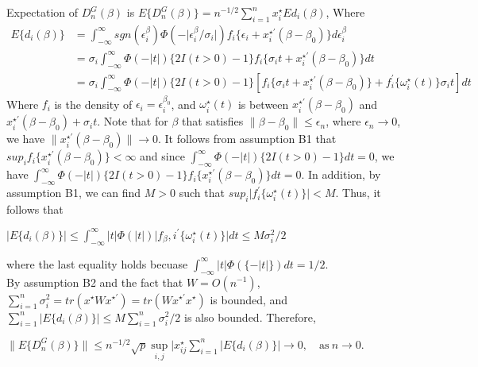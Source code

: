 \documentclass[12pt]{article}
\begin{document}
	\noindent Expectation of $D_n^G(\beta)$ is
	$E\{D_n^G(\beta)\}=n^{-1/2}\sum_{i=1}^{n}x_i^\star E{d_i(\beta)}$,
	Where 
	\begin{align*}
		E\{d_i(\beta)\} & = \int_{-\infty}^{\infty}sgn(\epsilon_i^\beta)\Phi(-\lvert\epsilon_i^\beta/\sigma_i\rvert)f_i\{\epsilon_i+x_i^{\star \prime}(\beta-\beta_0)\}d\epsilon_i^\beta\\
		& = \sigma_i \int_{-\infty}^{\infty}\Phi(-\lvert t \rvert)\{2I(t>0)-1\}f_i\{\sigma_i t + x_i^{\star \prime}(\beta-\beta_0)\}dt\\
		& = \sigma_i \int_{-\infty}^{\infty}\Phi(-\lvert t \rvert)\{2I(t>0)-1\}[f_i\{\sigma_i t + x_i^{\star \prime}(\beta-\beta_0)\}+f_i^\prime\{\omega_i^\star(t)\}\sigma_i t]dt
	\end{align*}
	\noindent Where $f_i$ is the density of $\epsilon_i=\epsilon_i^{\beta_0}$, and $\omega_i^\star(t)$ is between $x_i^{\star \prime} (\beta-\beta_0)$ and $x_i^{\star \prime} (\beta-\beta_0)+\sigma_i t$. Note that for $\beta$ that satisfies $\lVert \beta-\beta_0 \rVert \leq \epsilon_n$, where $\epsilon_n \to 0$, we have $\lVert x_i^{\star \prime} (\beta-\beta_0) \rVert \to 0$. It follows from assumption B1 that $sup_i f_i \{x_i^{\star \prime} (\beta-\beta_0)\}<\infty$ and since $\int_{-\infty}^{\infty} \Phi(-\lvert t \rvert)\{2I(t>0)-1\}dt=0$, we have $\int_{-\infty}^{\infty} \Phi(-\lvert t \rvert)\{2I(t>0)-1\}f_i \{x_i^{\star \prime} (\beta-\beta_0)\}dt=0$. In addition, by assumption B1, we can find $M>0$ such that $sup_i \lvert f_i^\prime \{\omega_i^\star (t)\}\rvert<M$. Thus, it follows that\\

	\begin{center}
		$\lvert E\{d_i(\beta)\} \rvert \leq \int_{-\infty}^{\infty} \lvert t \rvert \Phi(\lvert t \rvert) \lvert f_\beta, i ^\prime \{\omega_i^\star(t)\}\rvert dt \leq M \sigma_i^2 /2$
	\end{center}

	\noindent where the last equality holds becuase $\int_{-\infty}^{\infty} \lvert t \rvert \Phi (\{-\lvert t \rvert\})dt=1/2$.\\

	By assumption B2 and the fact that $W=O(n^{-1})$, $\sum_{i=1}^{n} \sigma_i^2=tr(x^\star W x^{\star \prime})=tr(W x^{\star \prime}x^\star)$ is bounded, and $\sum_{i=1}^{n} \lvert E\{d_i(\beta)\} \rvert \leq M \sum_{i=1}^{n}\sigma_i^2 /2$ is also bounded. Therefore,

	\begin{center}
		$\lVert E\{D_n^G(\beta)\} \rVert \leq n^{-1/2} \sqrt{p} \sup\limits_{i,j} \lvert x_{ij}^{\star} \sum_{i=1}^{n} \lvert E\{d_i(\beta)\} \rvert \to 0,\quad \text{as}\ n\to 0.$
	\end{center}
\end{document}
